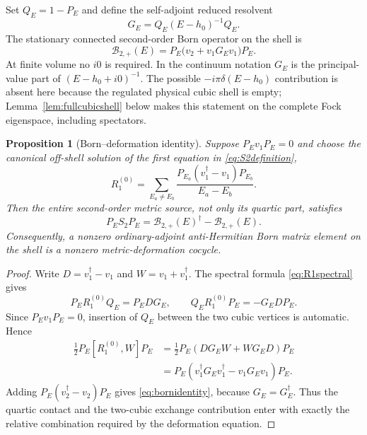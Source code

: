 \documentclass[11pt]{article}
\newtheorem{proposition}[theorem]{Proposition}
\theoremstyle{definition}
\theoremstyle{remark}
\newcommand{\dg}{\dagger}
\newcommand{\Born}{\mathcal B}
\begin{document}
Set $Q_E=1-P_E$ and define the self-adjoint reduced resolvent
\begin{equation}\label{eq:reducedresolvent}
G_E=Q_E(E-h_0)^{-1}Q_E.
\end{equation}
The stationary connected second-order Born operator on the shell is
\begin{equation}\label{eq:Bornoperator}
\Born_{2,+}(E)=P_E\bigl(v_2+v_1G_Ev_1\bigr)P_E.
\end{equation}
At finite volume no $i0$ is required.  In the continuum notation
$G_E$ is the principal-value part of $(E-h_0+i0)^{-1}$.  The possible
$-i\pi\delta(E-h_0)$ contribution is absent here because the regulated
physical cubic shell is empty; Lemma~\ref{lem:fullcubicshell} below
makes this statement on the complete Fock eigenspace, including
spectators.

\begin{proposition}[Born--deformation identity]
\label{prop:bornidentity}
Suppose $P_Ev_1P_E=0$ and choose the canonical off-shell solution of the
first equation in \eqref{eq:S2definition},
\begin{equation}\label{eq:R1spectral}
R_1^{(0)}=\sum_{E_a\ne E_b}
\frac{P_{E_a}(v_1^{\dg}-v_1)P_{E_b}}{E_a-E_b}.
\end{equation}
Then the entire second-order metric source, not only its quartic part,
satisfies
\begin{equation}\label{eq:bornidentity}
\boxed{
P_ES_2P_E
=\Born_{2,+}(E)^{\dg}-\Born_{2,+}(E).}
\end{equation}
Consequently, a nonzero ordinary-adjoint anti-Hermitian Born matrix
element on the shell is a nonzero metric-deformation cocycle.
\end{proposition}

\begin{proof}
Write $D=v_1^{\dg}-v_1$ and $W=v_1+v_1^{\dg}$.  The spectral formula
\eqref{eq:R1spectral} gives
\begin{equation}
P_ER_1^{(0)}Q_E=P_EDG_E,
\qquad
Q_ER_1^{(0)}P_E=-G_EDP_E.
\end{equation}
Since $P_Ev_1P_E=0$, insertion of $Q_E$ between the two cubic vertices
is automatic.  Hence
\begin{align}
\frac12P_E[R_1^{(0)},W]P_E
&=\frac12P_E(DG_EW+WG_ED)P_E\nonumber\\
&=P_E(v_1^{\dg}G_Ev_1^{\dg}-v_1G_Ev_1)P_E.\label{eq:commborn}
\end{align}
Adding $P_E(v_2^{\dg}-v_2)P_E$ gives
\eqref{eq:bornidentity}, because $G_E=G_E^{\dg}$.  Thus the quartic
contact and the two-cubic exchange contribution enter with exactly the
relative combination required by the deformation equation.
\end{proof}
\end{document}
